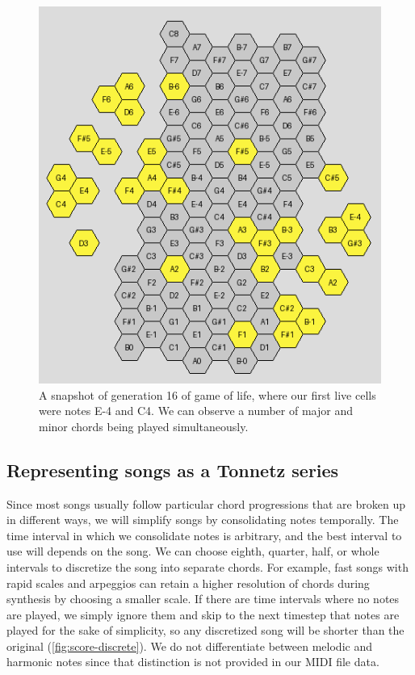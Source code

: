\documentclass[
	a4paper, %
	10pt, %
	unnumberedsections, %
	twoside, %
]{LTJournalArticle}
\begin{document}
\begin{figure}
    \centering
    \includegraphics[width=0.9\linewidth]{images/gameoflife-gen16.png}
    \caption{A snapshot of generation 16 of game of life, where our first live cells were notes E-4 and C4. We can observe a number of major and minor chords being played simultaneously.}
    \label{fig:gameoflife-gen16}
\end{figure}

\subsection{Representing songs as a Tonnetz series}

Since most songs usually follow particular chord progressions that are broken up in different ways, we will simplify songs by consolidating notes temporally. The time interval in which we consolidate notes is arbitrary, and the best interval to use will depends on the song. We can choose eighth, quarter, half, or whole intervals to discretize the song into separate chords. For example, fast songs with rapid scales and arpeggios can retain a higher resolution of chords during synthesis by choosing a smaller scale. If there are time intervals where no notes are played, we simply ignore them and skip to the next timestep that notes are played for the sake of simplicity, so any discretized song will be shorter than the original (\autoref{fig:score-discrete}). We do not differentiate between melodic and harmonic notes since that distinction is not provided in our MIDI file data.
\end{document}
